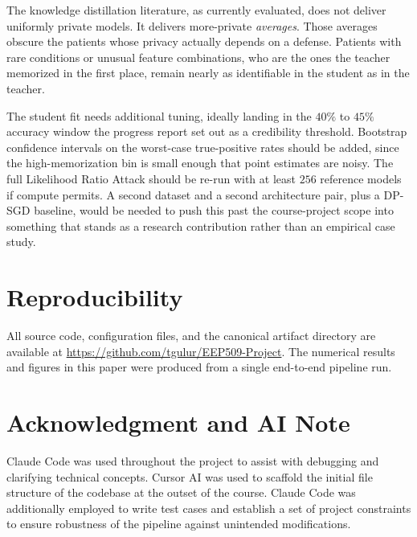 \documentclass[conference]{IEEEtran}
\begin{document}
The knowledge distillation literature, as currently evaluated, does not deliver uniformly private models. It delivers more-private \emph{averages}. Those averages obscure the patients whose privacy actually depends on a defense. Patients with rare conditions or unusual feature combinations, who are the ones the teacher memorized in the first place, remain nearly as identifiable in the student as in the teacher.

The student fit needs additional tuning, ideally landing in the $40\%$ to $45\%$ accuracy window the progress report set out as a credibility threshold. Bootstrap confidence intervals on the worst-case true-positive rates should be added, since the high-memorization bin is small enough that point estimates are noisy. The full Likelihood Ratio Attack should be re-run with at least $256$ reference models if compute permits. A second dataset and a second architecture pair, plus a DP-SGD baseline, would be needed to push this past the course-project scope into something that stands as a research contribution rather than an empirical case study.

\section*{Reproducibility}

All source code, configuration files, and the canonical artifact directory are available at \url{https://github.com/tgulur/EEP509-Project}. The numerical results and figures in this paper were produced from a single end-to-end pipeline run.

\section*{Acknowledgment and AI Note}

Claude Code was used throughout the project to assist with debugging and clarifying technical concepts. Cursor AI was used to scaffold the initial file structure of the codebase at the outset of the course. Claude Code was additionally employed to write test cases and establish a set of project constraints to ensure robustness of the pipeline against unintended modifications.
\end{document}
